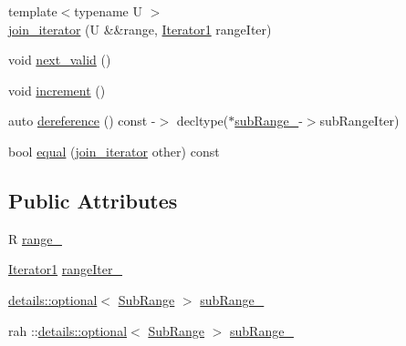 \begin{DoxyCompactItemize}
\item 
{\footnotesize template$<$typename U $>$ }\\\mbox{\hyperlink{structrah_1_1view_1_1join__iterator_a2ba7e5d1fd1ea1e786ca894fe96ffeb4}{join\+\_\+iterator}} (U \&\&range, \mbox{\hyperlink{structrah_1_1view_1_1join__iterator_a8b71c6f25eee2915e2a8afc6e024196d}{Iterator1}} range\+Iter)
\item 
void \mbox{\hyperlink{structrah_1_1view_1_1join__iterator_a6b3ef13305f87d011e2fecdb28b5dec6}{next\+\_\+valid}} ()
\item 
void \mbox{\hyperlink{structrah_1_1view_1_1join__iterator_a4f81464b6ff2707bb21d2bbd409c4f4d}{increment}} ()
\item 
auto \mbox{\hyperlink{structrah_1_1view_1_1join__iterator_ac7bc0fcd91d164f86d5813421a08d38a}{dereference}} () const -\/$>$ decltype($\ast$\mbox{\hyperlink{structrah_1_1view_1_1join__iterator_ae9351284af0f64c368606315da0b56a5}{sub\+Range\+\_\+}}-\/$>$sub\+Range\+Iter)
\item 
bool \mbox{\hyperlink{structrah_1_1view_1_1join__iterator_a76c4e51e7c191e189e01d15eff2b7055}{equal}} (\mbox{\hyperlink{structrah_1_1view_1_1join__iterator}{join\+\_\+iterator}} other) const
\end{DoxyCompactItemize}
\subsection*{Public Attributes}
\begin{DoxyCompactItemize}
\item 
R \mbox{\hyperlink{structrah_1_1view_1_1join__iterator_ad167fb9c44c21ad59d5acfa9031e9153}{range\+\_\+}}
\item 
\mbox{\hyperlink{structrah_1_1view_1_1join__iterator_a8b71c6f25eee2915e2a8afc6e024196d}{Iterator1}} \mbox{\hyperlink{structrah_1_1view_1_1join__iterator_a754b7bdee5ca2b23868a402c2c3cfcc2}{range\+Iter\+\_\+}}
\item 
\mbox{\hyperlink{structrah_1_1view_1_1details_1_1optional}{details\+::optional}}$<$ \mbox{\hyperlink{structrah_1_1view_1_1join__iterator_1_1_sub_range}{Sub\+Range}} $>$ \mbox{\hyperlink{structrah_1_1view_1_1join__iterator_ae9351284af0f64c368606315da0b56a5}{sub\+Range\+\_\+}}
\item 
rah \+::\mbox{\hyperlink{structrah_1_1view_1_1details_1_1optional}{details\+::optional}}$<$ \mbox{\hyperlink{structrah_1_1view_1_1join__iterator_1_1_sub_range}{Sub\+Range}} $>$ \mbox{\hyperlink{structrah_1_1view_1_1join__iterator_ac4ca6ff3a0816533a5aa0cd49dbb630d}{sub\+Range\+\_\+}}
\end{DoxyCompactItemize}


